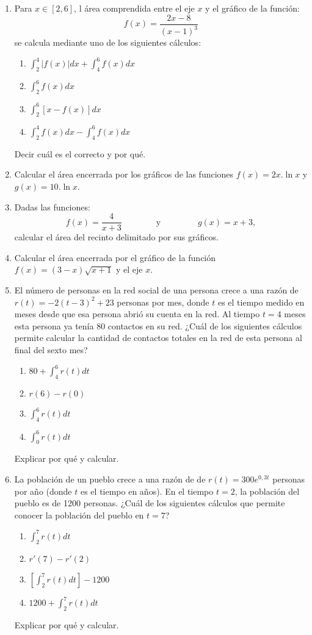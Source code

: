 \documentclass[12pt]{article}
\theoremstyle{definition}
\begin{document}
\begin{enumerate}
\item  
Para $x \in[2,6]$, l área comprendida entre  el eje $x$ y el gráfico de la función:
\begin{equation*}
f(x) = \frac{2x-8}{(x-1)^3}
\end{equation*}
se calcula mediante uno de los  siguientes cálculos:
\begin{enumerate}
\item $\int_{2}^{4}|f(x)|dx+ \int_{4}^{6}f(x)dx$
\item $\int_{2}^{6}f(x)dx $
\item $\int_{2}^{6}[x-f(x)]dx$
\item $\int_{2}^{4}f(x)dx - \int_{4}^{6}f(x)dx$
\end{enumerate}
Decir cuál es el correcto y por qué.

\item  
Calcular el área encerrada por los gráficos de las funciones $f(x) = 2x.\ln x$ y $g(x) = 10.\ln x$.

\item  
Dadas las funciones: 
\begin{equation*}
f(x) = \frac{4}{x+3}  \qquad \qquad    \text{y }\qquad \qquad  g(x) = x + 3,
\end{equation*}
calcular el área del recinto delimitado por sus gráficos. 

\item  
Calcular el área encerrada por el gráfico de la función $f(x) =(3-x) \sqrt{x+1}$ y el eje $x$.

\item  
El número de personas en la red social de una persona crece a una razón de $r(t)= -2(t-3)^2+23$ personas por mes, donde $t$ es el tiempo medido en meses desde que esa persona abrió su cuenta en la red. Al tiempo $t=4$ meses esta persona ya tenía 80 contactos en su red. ¿Cuál de los siguientes cálculos permite calcular la cantidad de contactos totales  en la red de esta persona al final del sexto mes? 
\begin{enumerate}
\item $80 + \int_{4}^{6}r(t)dt$
\item $r(6) - r(0) $
\item $\int_{4}^{6}r(t)dt$
\item $\int_{0}^{6}r(t)dt$
\end{enumerate}
Explicar por qué y calcular. 

\item  
La población de un pueblo crece a una razón de de $r(t)=300e^{0,3t}$  personas por año (donde $t$ es el tiempo en años). En el tiempo $t=2$, la población del pueblo es de 1200 personas. ¿Cuál de los siguientes cálculos que permite conocer la población del pueblo en $t=7$? 
\begin{enumerate}
\item $\int_{2}^{7}r(t)dt$
\item $r'(7) - r'(2) $
\item $[\int_{2}^{7}r(t)dt] -1200$
\item $1200 + \int_{2}^{7}r(t)dt$
\end{enumerate}
Explicar por qué y calcular. 


\end{enumerate}
\end{document}
